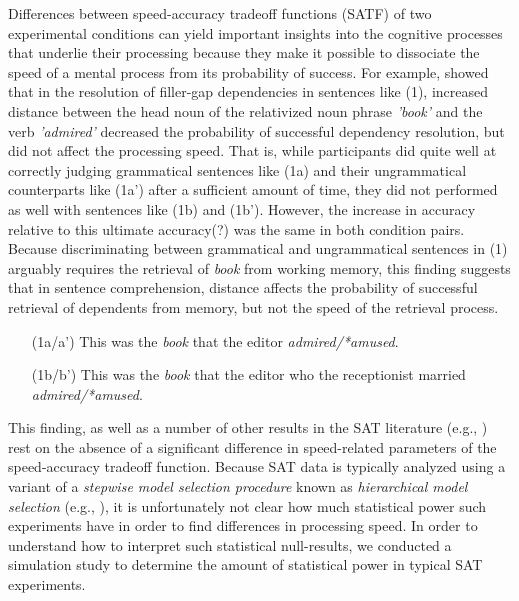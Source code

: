 \documentclass[10pt,letterpaper]{article}
\begin{document}
Differences between speed-accuracy tradeoff functions (SATF) of two experimental conditions can yield important insights into the cognitive processes that underlie their processing because they make it possible to dissociate the speed of a mental process from its probability of success. For example,  showed that in the resolution of filler-gap dependencies in sentences like (1), increased distance between the head noun of the relativized noun phrase \textit{'book'} and the verb \textit{'admired'} decreased the probability of successful dependency resolution, but did not affect the processing speed. That is, while participants did quite well at correctly judging grammatical sentences like (1a) and their ungrammatical counterparts like (1a') after a sufficient amount of time, they did not performed as well with sentences like (1b) and (1b'). However, the increase in accuracy relative to this ultimate accuracy(?) was the same in both condition pairs. Because discriminating between grammatical and ungrammatical sentences in (1) arguably requires the retrieval of \textit{book} from working memory, this finding suggests that in sentence comprehension, distance affects the probability of successful retrieval of dependents from memory, but not the speed of the retrieval process.

\setlength{\leftmargini}{3.2em}
\begin{itemize}
\item[(1a/a')] This was the \textit{book} that the editor \textit{admired/*amused}. 
\item[(1b/b')] This was the \textit{book} that the editor who the receptionist married \textit{admired/*amused}.
\end{itemize}

This finding, as well as a number of other results in the SAT literature (e.g., ) rest on the absence of a significant difference in speed-related parameters of the speed-accuracy tradeoff function. Because SAT data is typically analyzed using a variant of a \textit{stepwise model selection procedure} 
known as \textit{hierarchical model selection} (e.g., ), it is unfortunately not clear how much statistical power such experiments have in order to find differences in processing speed. 
In order to understand how to interpret such statistical null-results, we conducted a simulation study to determine the amount of statistical power in typical SAT experiments.
\end{document}
